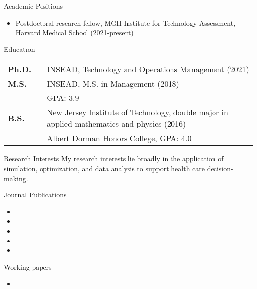 \documentclass{resume}
\begin{document}


\begin{rSection}{Academic Positions}
  \begin{itemize}
    \item Postdoctoral research fellow, MGH Institute for Technology Assessment, Harvard Medical School (2021-present)
  \end{itemize}
\end{rSection}


\begin{rSection}{Education}

\begin{tabular}{lll}
\textbf{Ph.D.} & & INSEAD, Technology and Operations Management (2021)\\
\textbf{M.S.} & & INSEAD, M.S. in Management (2018)\\
& & GPA: 3.9\\
\textbf{B.S.} & & New Jersey Institute of Technology, double major in applied mathematics and physics (2016)\\
& & Albert Dorman Honors College, GPA: 4.0
\end{tabular}

\end{rSection}

\begin{rSection}{Research Interests}
My research interests lie broadly in the application of simulation, optimization, and data analysis to support health care decision-making.
\end{rSection}

\begin{rSection}{Journal Publications}
\begin{itemize}
\item {}
\item {}
\item {}
\item {}
\item {}
\end{itemize}
\end{rSection}

\begin{rSection}{Working papers}
\begin{itemize}
  \item {}
\end{itemize}
\end{rSection}
\end{document}
